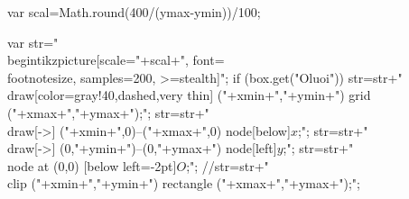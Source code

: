 {{{{				var scal=Math.round(400/(ymax-ymin))/100;
				
				var str="\\begin{tikzpicture}[scale="+scal+", font=\\footnotesize, samples=200, >=stealth]";
				if (box.get("Oluoi")) 
				str=str+"\n\\draw[color=gray!40,dashed,very thin] ("+xmin+","+ymin+") grid ("+xmax+","+ymax+");";
				str=str+"\n\\draw[->] ("+xmin+",0)--("+xmax+",0) node[below]{$x$};";
				str=str+"\n\\draw[->] (0,"+ymin+")--(0,"+ymax+") node[left]{$y$};";
				str=str+"\n\\node at (0,0) [below left=-2pt]{$O$};";
				//str=str+"\n\\clip ("+xmin+","+ymin+") rectangle ("+xmax+","+ymax+");\n";
				
}}}}
